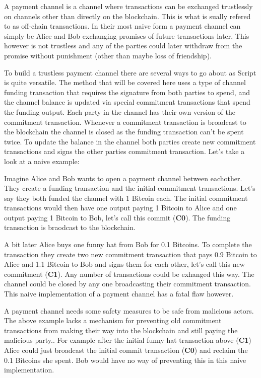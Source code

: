 
A payment channel is a channel where transactions can be exchanged trustlessly on channels other than directly on the blockchain.
This is what is sually refered to as off-chain transactions.
In their most naive form a payment channel can simply be Alice and Bob exchanging promises of future transactions later.
This however is not trustless and any of the parties could later withdraw from the promise without punishment (other than maybe loss of friendship).

To build a trustless payment channel there are several ways to go about as Script is quite versatile.
The method that will be covered here uses a type of channel funding transaction that requires the signature from both parties to spend, and the channel balance is updated via special commitment transactions that spend the funding output. Each party in the channel has their own version of the commitment transaction. Whenever a commitment transaction is broadcast to the blockchain the channel is closed as the funding transaction can't be spent twice. To update the balance in the channel both parties create new commitment transactions and signs the other parties commitment transaction.  
Let's take a look at a naive example:

Imagine Alice and Bob wants to open a payment channel between eachother. They create a funding transaction and the initial commitment transactions. Let's say they both funded the channel with 1 Bitcoin each. The initial commitment transactions would then have one output paying 1 Bitcoin to Alice and one output paying 1 Bitcoin to Bob, let's call this commit (\textbf{C0}).
The funding transaction is braodcast to the blockchain.

A bit later Alice buys one funny hat from Bob for 0.1 Bitcoins. To complete the transaction they create two new commitment transaction that pays 0.9 Bitcoin to Alice and 1.1 Bitcoin to Bob and signs them for each other, let's call this new commitment (\textbf{C1}). Any number of transactions could be exhanged this way. The channel could be closed by any one broadcasting their commitment transaction. This naive implementation of a payment channel has a fatal flaw however. 

A payment channel needs some safety measures to be safe from malicious actors. The above example lacks a mechanism for preventing old commitment transactions from making their way into the blockchain and still paying the malicious party.. For example after the initial funny hat transaction above (\textbf{C1}) Alice could just broadcast the initial commit transaction (\textbf{C0}) and reclaim the 0.1 Bitcoins she spent. Bob would have no way of preventing this in this naive implementation.

